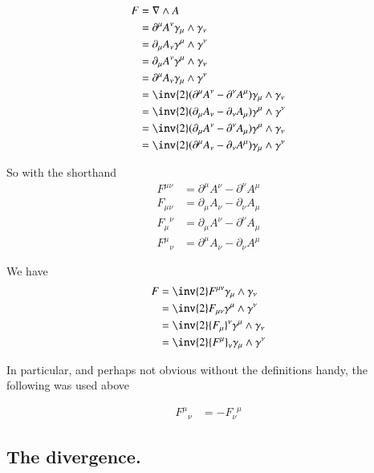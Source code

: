 \documentclass{article}
\begin{document}
\begin{align*}
F &= \grad \wedge A \\
&= \partial^\mu A^\nu \gamma_\mu \wedge \gamma_\nu \\
&= \partial_\mu A_\nu \gamma^\mu \wedge \gamma^\nu \\
&= \partial_\mu A^\nu \gamma^\mu \wedge \gamma_\nu \\ 
&= \partial^\mu A_\nu \gamma_\mu \wedge \gamma^\nu \\
&= \inv{2}(\partial^\mu A^\nu -\partial^\nu A^\mu ) \gamma_\mu \wedge \gamma_\nu \\
&= \inv{2}(\partial_\mu A_\nu -\partial_\nu A_\mu ) \gamma^\mu \wedge \gamma^\nu \\
&= \inv{2}(\partial_\mu A^\nu -\partial^\nu A_\mu ) \gamma^\mu \wedge \gamma_\nu \\ 
&= \inv{2}(\partial^\mu A_\nu -\partial_\nu A^\mu ) \gamma_\mu \wedge \gamma^\nu
\end{align*}

So with the shorthand
\begin{align*}
F^{\mu\nu} &= \partial^\mu A^\nu -\partial^\nu A^\mu \\
F_{\mu\nu} &= \partial_\mu A_\nu -\partial_\nu A_\mu \\
{F_{\mu}}^{\nu} &= \partial_\mu A^\nu -\partial^\nu A_\mu \\
{F^{\mu}}_{\nu} &= \partial^\mu A_\nu -\partial_\nu A^\mu
\end{align*}

We have
\begin{align*}
F 
&= \inv{2}F^{\mu\nu} \gamma_\mu \wedge \gamma_\nu \\
&= \inv{2}F_{\mu\nu} \gamma^\mu \wedge \gamma^\nu \\
&= \inv{2}{F_\mu}^\nu \gamma^\mu \wedge \gamma_\nu \\ 
&= \inv{2}{F^\mu}_\nu \gamma_\mu \wedge \gamma^\nu
\end{align*}

In particular, and perhaps not obvious without the definitions handy, the following was used above

\begin{align*}
{F^{\mu}}_{\nu} &= -{F_{\nu}}^{\mu}
\end{align*}

\subsection{ The divergence. }
\end{document}
